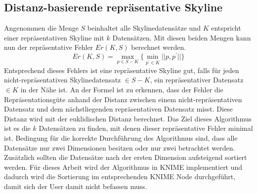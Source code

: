 \subsection{Distanz-basierende repräsentative Skyline}
\label{ch:Analyse:sec:repSkyAlgos:subsec:disBasedRepSky}
Angenommen die Menge $S$ beinhaltet alle Skylinedatensätze und $K$ entspricht einer repräsentativen Skyline mit $k$ Datensätzen. Mit diesen beiden Mengen kann nun der repräsentative Fehler $Er(K,S)$ berechnet werden. 
$$Er(K,S)=\max\limits_{p\in{S-K}}\{\min\limits_{p^{'} \in{K}}||p,p^{'}||\}$$
Entsprechend dieses Fehlers ist eine repräsentative Skyline gut, falls für jeden nicht-repräsentativen Skylinedatensatz $\in{S-K}$, ein repräsentativer Datensatz $\in{K}$ in der Nähe ist. An der Formel ist zu erkennen, dass der Fehler die Repräsentationsgüte anhand der Distanz zwischen einem nicht-repräsentativen Datensatz und dem nächstliegenden repräsentativen Datensatz misst. Diese Distanz wird mit der euklidischen Distanz berechnet.
Das Ziel dieses Algorithmus ist es die $k$ Datensätzen zu finden, mit denen dieser repräsentative Fehler minimal ist. Bedingung für die korrekte Durchführung des Algorithmus sind, dass alle Datensätze nur zwei Dimensionen besitzen oder nur zwei betrachtet werden. Zusätzlich sollten die Datensätze nach der ersten Dimension aufsteigend sortiert werden. Für dieses Arbeit wird der Algorithmus in KNIME implementiert und dadurch wird die Sortierung im entsprechenden KNIME Node durchgeführt, damit sich der User damit nicht befassen muss. 

